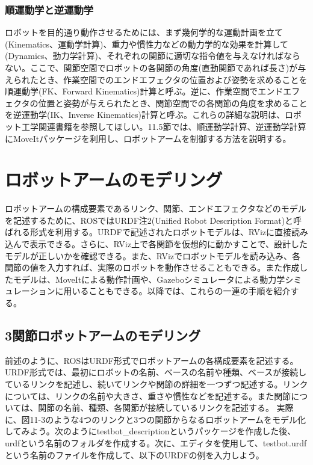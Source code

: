 \subsubsection{順運動学と逆運動学}

ロボットを目的通り動作させるためには、まず幾何学的な運動計画を立て(Kinematics、運動学計算)、重力や慣性力などの動力学的な効果を計算して(Dynamics、動力学計算)、それぞれの関節に適切な指令値を与えなければならない。ここで、関節空間でロボットの各関節の角度(直動関節であれば長さ)が与えられたとき、作業空間でのエンドエフェクタの位置および姿勢を求めることを順運動学(FK、Forward Kinematics)計算と呼ぶ。逆に、作業空間でエンドエフェクタの位置と姿勢が与えられたとき、関節空間での各関節の角度を求めることを逆運動学(IK、Inverse Kinematics)計算と呼ぶ。これらの詳細な説明は、ロボット工学関連書籍を参照してほしい。11.5節では、順運動学計算、逆運動学計算にMoveItパッケージを利用し、ロボットアームを制御する方法を説明する。

\section{ロボットアームのモデリング}

ロボットアームの構成要素であるリンク、関節、エンドエフェクタなどのモデルを記述するために、ROSではURDF注2(Unified Robot Description Format)と呼ばれる形式を利用する。URDFで記述されたロボットモデルは、RVizに直接読み込んで表示できる。さらに、RViz上で各関節を仮想的に動かすことで、設計したモデルが正しいかを確認できる。また、RVizでロボットモデルを読み込み、各関節の値を入力すれば、実際のロボットを動作させることもできる。また作成したモデルは、MoveItによる動作計画や、Gazeboシミュレータによる動力学シミュレーションに用いることもできる。以降では、これらの一連の手順を紹介する。

\subsection{3関節ロボットアームのモデリング}

前述のように、ROSはURDF形式でロボットアームの各構成要素を記述する。URDF形式では、最初にロボットの名前、ベースの名前や種類、ベースが接続しているリンクを記述し、続いてリンクや関節の詳細を一つずつ記述する。リンクについては、リンクの名前や大きさ、重さや慣性などを記述する。また関節については、関節の名前、種類、各関節が接続しているリンクを記述する。
実際に、図11-3のような4つのリンクと3つの関節からなるロボットアームをモデル化してみよう。次のようにtestbot\_descriptionというパッケージを作成した後、urdfという名前のフォルダを作成する。次に、エディタを使用して、testbot.urdfという名前のファイルを作成して、以下のURDFの例を入力しよう。

